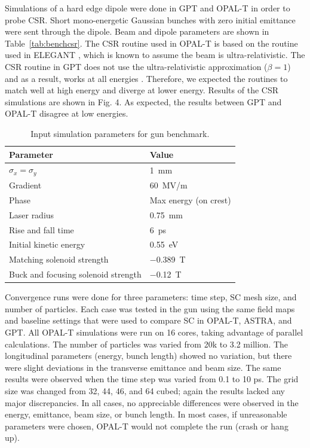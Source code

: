 \documentclass{iitthesis}
\begin{document}
Simulations  of  a  hard  edge  dipole  were  done  in  GPT  
and   OPAL-T   in   order   to   probe   CSR.   Short   
mono-energetic  Gaussian  bunches  with  zero  initial  emittance  
were sent through the dipole. Beam and dipole parameters 
are shown in Table~\ref{tab:benchcsr}. 
The CSR routine used in OPAL-T is based on 
the routine  used  in  ELEGANT  \cite{elegant}, which is known to assume  
the beam is ultra-relativistic. The CSR routine in GPT  
does  not  use  the  ultra-relativistic  approximation ($\beta=1$) 
and  as  a  result,  works  at  all energies  \cite{gptcsr}.  
Therefore, we expected  the  routines  to  match  well  at  high  energy  and  
diverge  at  lower  energy.  Results  of  the  CSR  simulations  
are  shown  in  Fig.  4.  As  expected,  the  results  between  
GPT and OPAL-T disagree at low energies. 
\begin{table}
	\begin{center}
		\begin{tabular}{l l} 
			\toprule
			\textbf{Parameter} & \textbf{Value} \\ 
			\midrule
			$\sigma_x =\sigma_y$ & \SI{1}{mm} \\
			\addlinespace[-1em] 
			Gradient & \SI{60}{MV/m} \\
			\addlinespace[-1em] 
			Phase & Max energy (on crest) \\
			\addlinespace[-1em] 
			Laser radius & \SI{0.75}{mm} \\
			\addlinespace[-1em] 
			Rise and fall time & \SI{6}{ps} \\
			\addlinespace[-1em] 
			Initial kinetic energy & \SI{0.55}{eV} \\
			\addlinespace[-1em] 
			Matching solenoid strength & \SI{-0.389}{T} \\
			\addlinespace[-1em] 
			Buck and focusing solenoid strength & \SI{-0.12}{T} \\
			\bottomrule			
		\end{tabular}
	\end{center}
	\caption{Input simulation parameters for gun benchmark.}
\end{table}\label{tab:benchcsr}


Convergence runs were done for three parameters: 
time step,  SC  mesh  size,  and  number  of  particles.  
Each  case was tested in the gun using the same field maps and 
baseline  settings  that  were  used  to  compare  SC  in  OPAL-T,  
ASTRA, and GPT. All OPAL-T simulations were run on 
16 cores, taking advantage of parallel calculations. 
The number of particles was varied from 20k to 3.2  million.  
The  longitudinal  parameters  (energy,  bunch length)  
showed  no  variation,  but  there  were  slight  deviations 
in the transverse emittance and beam size. The same results 
were observed when the time step was varied from 0.1  to  10  ps.  
The  grid  size  was  changed  from  32,  44,  46, and 64 cubed; 
again the results lacked any major discrepancies.  
In all cases, no appreciable differences were observed in the energy,
emittance, beam size, or bunch length. In  most  cases,  
if unreasonable  parameters  were chosen, 
OPAL-T would not complete the run (crash or hang up).  
\end{document}
